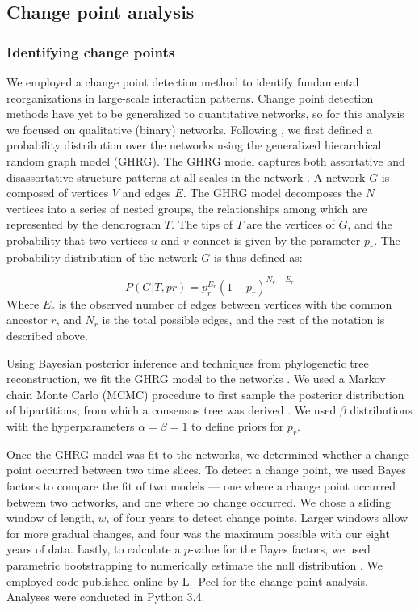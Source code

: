 \documentclass[12pt]{article}
\begin{document}
\subsection*{Change point analysis}
\subsubsection*{Identifying change points}
We employed a change point detection method \citep{peel2014detecting}
to identify fundamental reorganizations in large-scale interaction
patterns. Change point detection methods have yet to be generalized to
quantitative networks, so for this analysis we focused on qualitative
(binary) networks. Following \cite{peel2014detecting}, we first
defined a probability distribution over the networks using the
generalized hierarchical random graph model (GHRG). The GHRG model
captures both assortative and disassortative structure patterns at all
scales in the network \citep{peel2014detecting}. A network $G$ is
composed of vertices $V$ and edges $E$. The GHRG model decomposes the
$N$ vertices into a series of nested groups, the relationships among
which are represented by the dendrogram $T$. The tips of $T$ are the
vertices of $G$, and the probability that two vertices $u$ and $v$
connect is given by the parameter $p_r$. The probability distribution
of the network $G$ is thus defined as:

\begin{equation}
  \label{eq:lik}
  P(G|T,{pr}) = p_r^{E_r}(1-p_r)^{N_r-E_r}
\end{equation}
% 
Where $E_r$ is the observed number of edges between vertices with the
common ancestor $r$, and $N_r$ is the total possible edges, and the
rest of the notation is described above.

Using Bayesian posterior inference and techniques from phylogenetic
tree reconstruction, we fit the GHRG model to the networks
\citep{peel2014detecting}. We used a Markov chain Monte Carlo (MCMC)
procedure to first sample the posterior distribution of bipartitions,
from which a consensus tree was derived \citep{peel2014detecting}. We
used $\beta$ distributions with the hyperparameters $\alpha=\beta=1$
to define priors for $p_r$.

Once the GHRG model was fit to the networks, we determined whether a
change point occurred between two time slices. To detect a change
point, we used Bayes factors to compare the fit of two models --- one
where a change point occurred between two networks, and one where no
change occurred. We chose a sliding window of length, $w$, of four
years to detect change points. Larger windows allow for more gradual
changes, and four was the maximum possible with our eight years of
data. Lastly, to calculate a $p$-value for the Bayes factors, we used
parametric bootstrapping to numerically estimate the null distribution
\citep{peel2014detecting}. We employed code published online by
L.~Peel for the change point analysis. Analyses were conducted in
Python 3.4.
\end{document}
